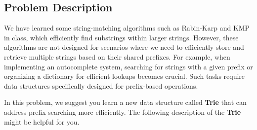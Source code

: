 
\providecommand{\tightlist}{\setlength{\itemsep}{0pt}\setlength{\parskip}{0pt}}
\setcounter{secnumdepth}{0}

\subsection{Problem Description}\label{problem-description}

We have learned some string-matching algorithms such as Rabin-Karp and KMP in class, which efficiently find substrings within larger strings. However, these algorithms are not designed for scenarios where we need to efficiently store and retrieve multiple strings based on their shared prefixes. For example, when implementing an autocomplete system, searching for strings with a given prefix or organizing a dictionary for efficient lookups becomes crucial. Such tasks require data structures specifically designed for prefix-based operations.

In this problem, we suggest you learn a new data structure called \textbf{Trie} that can address prefix searching more efficiently. The following description of the \textbf{Trie} might be helpful for you.

